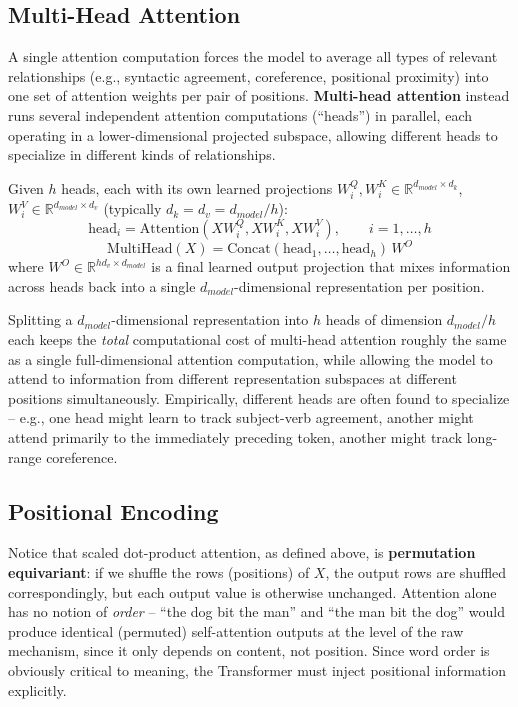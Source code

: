 \documentclass[11pt]{article}
\begin{document}
\subsection*{Multi-Head Attention}

A single attention computation forces the model to average all types of relevant relationships (e.g., syntactic agreement, coreference, positional proximity) into one set of attention weights per pair of positions. \textbf{Multi-head attention} instead runs several independent attention computations (``heads'') in parallel, each operating in a lower-dimensional projected subspace, allowing different heads to specialize in different kinds of relationships.

\begin{defbox}
Given $h$ heads, each with its own learned projections $W_i^Q, W_i^K \in \mathbb{R}^{d_{model}\times d_k}$, $W_i^V \in \mathbb{R}^{d_{model}\times d_v}$ (typically $d_k = d_v = d_{model}/h$):
\[
\text{head}_i = \text{Attention}(XW_i^Q, XW_i^K, XW_i^V), \qquad i = 1, \ldots, h
\]
\[
\text{MultiHead}(X) = \text{Concat}(\text{head}_1, \ldots, \text{head}_h)\, W^O
\]
where $W^O \in \mathbb{R}^{h d_v \times d_{model}}$ is a final learned output projection that mixes information across heads back into a single $d_{model}$-dimensional representation per position.
\end{defbox}

\begin{keyidea}
Splitting a $d_{model}$-dimensional representation into $h$ heads of dimension $d_{model}/h$ each keeps the \emph{total} computational cost of multi-head attention roughly the same as a single full-dimensional attention computation, while allowing the model to attend to information from different representation subspaces at different positions simultaneously. Empirically, different heads are often found to specialize -- e.g., one head might learn to track subject-verb agreement, another might attend primarily to the immediately preceding token, another might track long-range coreference.
\end{keyidea}

\subsection*{Positional Encoding}

Notice that scaled dot-product attention, as defined above, is \textbf{permutation equivariant}: if we shuffle the rows (positions) of $X$, the output rows are shuffled correspondingly, but each output value is otherwise unchanged. Attention alone has no notion of \emph{order} -- ``the dog bit the man'' and ``the man bit the dog'' would produce identical (permuted) self-attention outputs at the level of the raw mechanism, since it only depends on content, not position. Since word order is obviously critical to meaning, the Transformer must inject positional information explicitly.
\end{document}
